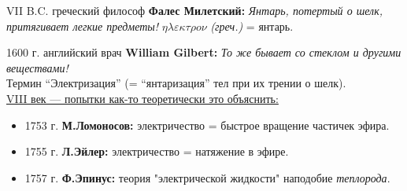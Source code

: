 \sf\Large


VII B.C. греческий философ {\bf Фалес Милетский:} {\sl Янтарь, потертый о шелк, притягивает легкие предметы!}
\hfill{ }\underline{$\eta\lambda\varepsilon\kappa\tau\rho o\nu$} {\em(греч.)} = янтарь.

1600 г. английский врач {\bf William Gilbert:} {\sl То же бывает со стеклом и другими веществами!}\\
Термин ``Электризация'' (= ``янтаризация'' тел при их трении о шелк).\\

\noindent\underline{VIII век --- попытки как-то теоретически это объяснить:}
\begin{itemize}
\item
1753 г. {\bf М.Ломоносов:} электричество = быстрое вращение частичек эфира.
\item
1755 г. {\bf Л.Эйлер:} электричество = натяжение в эфире.
\item
1757 г. {\bf Ф.Эпинус:} теория "электрической жидкости" наподобие {\sl теплорода}.
\end{itemize}

